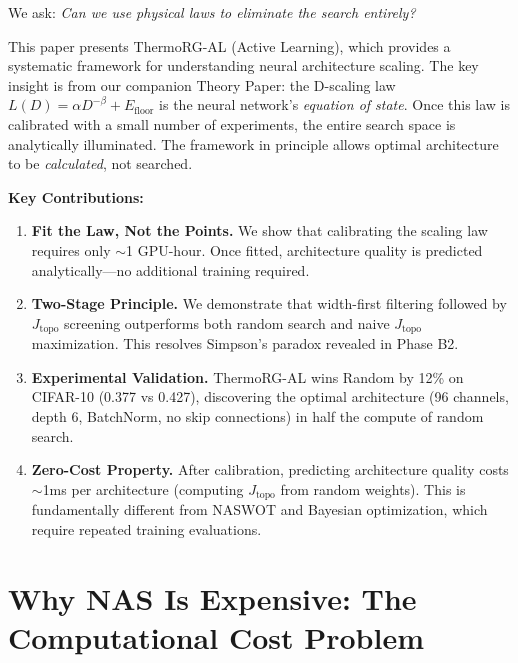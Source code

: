 \documentclass[11pt, a4paper]{article}
\theoremstyle{plain}
\begin{document}
We ask: \emph{Can we use physical laws to eliminate the search entirely?}

This paper presents ThermoRG-AL (Active Learning), which provides a systematic framework for understanding neural architecture scaling. The key insight is from our companion Theory Paper: the D-scaling law $L(D) = \alpha D^{-\beta} + E_{\mathrm{floor}}$ is the neural network's \emph{equation of state}. Once this law is calibrated with a small number of experiments, the entire search space is analytically illuminated. The framework in principle allows optimal architecture to be \emph{calculated}, not searched.

\bigskip\noindent\textbf{Key Contributions:}

\begin{enumerate}
\item \textbf{Fit the Law, Not the Points.} We show that calibrating the scaling law requires only $\sim$1 GPU-hour. Once fitted, architecture quality is predicted analytically---no additional training required.

\item \textbf{Two-Stage Principle.} We demonstrate that width-first filtering followed by $J_{\mathrm{topo}}$ screening outperforms both random search and naive $J_{\mathrm{topo}}$ maximization. This resolves Simpson's paradox revealed in Phase B2.

\item \textbf{Experimental Validation.} ThermoRG-AL wins Random by 12\% on CIFAR-10 (0.377 vs 0.427), discovering the optimal architecture (96 channels, depth 6, BatchNorm, no skip connections) in half the compute of random search.

\item \textbf{Zero-Cost Property.} After calibration, predicting architecture quality costs $\sim$1ms per architecture (computing $J_{\mathrm{topo}}$ from random weights). This is fundamentally different from NASWOT and Bayesian optimization, which require repeated training evaluations.
\end{enumerate}

\section{Why NAS Is Expensive: The Computational Cost Problem}
\end{document}
